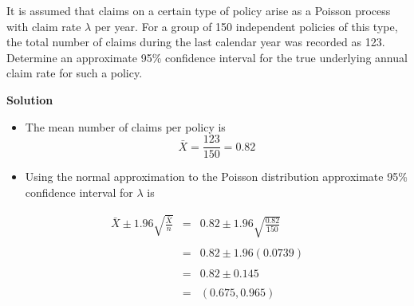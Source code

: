 \documentclass[a4paper,12pt]{article}
\begin{document}
\large
\noindent It is assumed that claims on a certain type of policy arise as a Poisson process with
claim rate $\lambda$ per year.
For a group of 150 independent policies of this type, the total number of claims during
the last calendar year was recorded as 123.
Determine an approximate 95\% confidence interval for the true underlying annual
claim rate for such a policy.

\noindent \textbf{Solution}

\begin{itemize}

\item The mean number of claims per policy is 
\[ \bar{X} = \frac{123}{150} = 0.82 \]

\item Using the normal approximation to the Poisson distribution approximate 95\% confidence interval for $\lambda$ is 
\end{itemize}
\begin{eqnarray*}
\bar{X} \pm 1.96 \sqrt{\frac{\bar{X}}{n}} 
&=& 0.82 \pm 1.96 \sqrt{\frac{{0.82}}{150}} \\
& & \\
&=& 0.82 \pm 1.96(0.0739)\\
& & \\
&=& 0.82 \pm 0.145 \\
& & \\
&=& (0.675, 0.965)\\
\end{eqnarray*}

\end{document}
